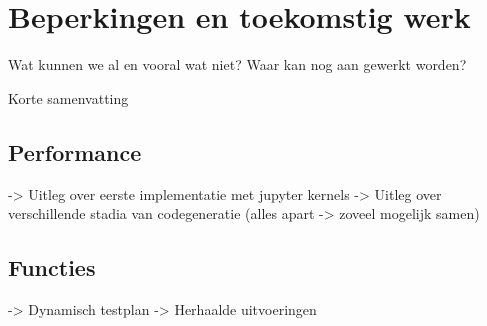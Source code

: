 \chapter{Beperkingen en toekomstig werk}\label{ch:beperkingen-en-toekomstig-werk}

Wat kunnen we al en vooral wat niet?
Waar kan nog aan gewerkt worden?

Korte samenvatting

\section{Performance}

-> Uitleg over eerste implementatie met jupyter kernels
-> Uitleg over verschillende stadia van codegeneratie (alles apart -> zoveel mogelijk samen)

\section{Functies}

-> Dynamisch testplan
-> Herhaalde uitvoeringen